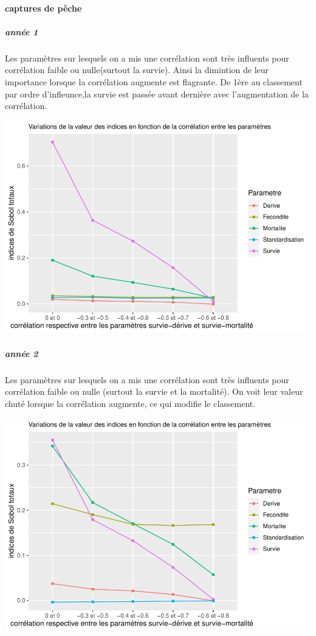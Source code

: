 \documentclass[
]{article}
\begin{document}
\hypertarget{captures-de-puxeache}{%
\paragraph{captures de pêche}\label{captures-de-puxeache}}

\hypertarget{annuxe9e-1-2}{%
\subparagraph{année 1}\label{annuxe9e-1-2}}

Les paramètres sur lesquels on a mis une corrélation sont très influents
pour corrélation faible ou nulle(surtout la survie). Ainsi la dimintion
de leur importance lorsque la corrélation augmente est flagrante. De
1ère au classement par ordre d'infleunce,la survie est passée avant
dernière avec l'augmentation de la corrélation.

\includegraphics{rapport_files/figure-latex/prtyagsbte-1.pdf}

\hypertarget{annuxe9e-2-1}{%
\subparagraph{année 2}\label{annuxe9e-2-1}}

Les paramètres sur lesquels on a mis une corrélation sont très influents
pour corrélation faible ou nulle (surtout la survie et la mortalité). On
voit leur valeur chuté lorsque la corrélation augmente, ce qui modifie
le classement.

\includegraphics{rapport_files/figure-latex/prtaygsbte-1.pdf}
\end{document}
